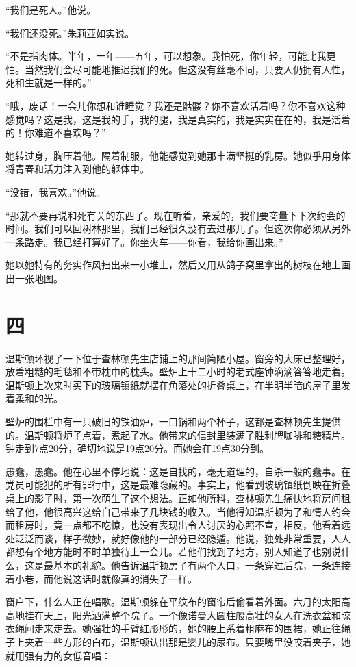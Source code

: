 ``我们是死人。''他说。

``我们还没死。''朱莉亚如实说。

``不是指肉体。半年，一年——五年，可以想象。我怕死，你年轻，可能比我更怕。当然我们会尽可能地推迟我们的死。但这没有丝毫不同，只要人仍拥有人性，死和生就是一样的。''

``哦，废话！一会儿你想和谁睡觉？我还是骷髅？你不喜欢活着吗？你不喜欢这种感觉吗？这是我，这是我的手，我的腿，我是真实的，我是实实在在的，我是活着的！你难道不喜欢吗？''

她转过身，胸压着他。隔着制服，他能感觉到她那丰满坚挺的乳房。她似乎用身体将青春和活力注入到他的躯体中。

``没错，我喜欢。''他说。

``那就不要再说和死有关的东西了。现在听着，亲爱的，我们要商量下下次约会的时间。我们可以回树林那里，我们已经很久没有去过那儿了。但这次你必须从另外一条路走。我已经打算好了。你坐火车——你看，我给你画出来。''

她以她特有的务实作风扫出来一小堆土，然后又用从鸽子窝里拿出的树枝在地上画出一张地图。

\section*{四}\label{ux5341ux4e8c}

温斯顿环视了一下位于查林顿先生店铺上的那间简陋小屋。窗旁的大床已整理好，放着粗糙的毛毯和不带枕巾的枕头。壁炉上十二小时的老式座钟滴滴答答地走着。温斯顿上次来时买下的玻璃镇纸就摆在角落处的折叠桌上，在半明半暗的屋子里发着柔和的光。

壁炉的围栏中有一只破旧的铁油炉，一口锅和两个杯子，这都是查林顿先生提供的。温斯顿将炉子点着，煮起了水。他带来的信封里装满了胜利牌咖啡和糖精片。钟走到7点20分，确切地说是19点20分。而她会在19点30分到。

愚蠢，愚蠢。他在心里不停地说：这是自找的，毫无道理的，自杀一般的蠢事。在党员可能犯的所有罪行中，这是最难隐藏的。事实上，他看到玻璃镇纸倒映在折叠桌上的影子时，第一次萌生了这个想法。正如他所料，查林顿先生痛快地将房间租给了他，他很高兴这给自己带来了几块钱的收入。当他得知温斯顿为了和情人约会而租房时，竟一点都不吃惊，也没有表现出令人讨厌的心照不宣，相反，他看着远处泛泛而谈，样子微妙，就好像他的一部分已经隐遁。他说，独处非常重要，人人都想有个地方能时不时单独待上一会儿。若他们找到了地方，别人知道了也别说什么，这是最基本的礼貌。他告诉温斯顿房子有两个入口，一条穿过后院，一条连接着小巷，而他说这话时就像真的消失了一样。

窗户下，什么人正在唱歌。温斯顿躲在平纹布的窗帘后偷看着外面。六月的太阳高高地挂在天上，阳光洒满整个院子。一个像诺曼大圆柱般高壮的女人在洗衣盆和晾衣绳间走来走去。她强壮的手臂红彤彤的，她的腰上系着粗麻布的围裙，她正往绳子上夹着一些方形的白布，温斯顿认出那是婴儿的尿布。只要嘴里没咬着夹子，她就用强有力的女低音唱：

